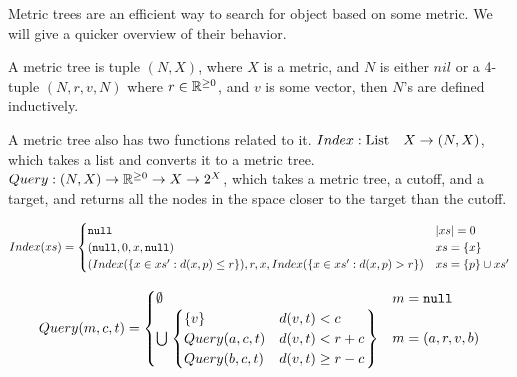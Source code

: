 Metric trees are an efficient way to search for object based on some metric.
We will give a quicker overview of their behavior.

\begin{definition}
A metric tree is tuple $(N, X)$, where $X$ is a metric,
and $N$ is either $nil$ or a 4-tuple $(N, r, v, N)$
where $r \in \mathbb{R}^{\ge 0}$, and $v$ is some vector,
then $N$'s are defined inductively.
\end{definition}

A metric tree also has two functions related to it.
$Index : \text{List}\quad X \to (N, X)$, which takes a list and converts it to a metric tree. 
$Query : (N, X) \to \mathbb{R}^{\ge 0} \to X \to 2^X$, which takes a metric tree, a cutoff, and a target,
and returns all the nodes in the space closer to the target than the cutoff.

$$Index(xs) = \begin{cases}
    \texttt{null} & |xs| = 0 \\
    (\texttt{null}, 0, x, \texttt{null}) & xs = \{x\} \\
    (Index(\{x \in xs' : d(x, p) \le r\}), r, x, Index(\{x \in xs' : d(x, p) > r\}) 
    & xs = \{p\}\cup{xs'}
\end{cases}$$

$$Query(m, c, t) = \begin{cases}
    \emptyset & m = \texttt{null} \\
    \bigcup \left. \begin{cases}
        \{v\} & d(v, t) < c \\ 
        Query(a, c, t) & d(v, t) < r + c \\ 
        Query(b, c, t) & d(v, t) \ge r - c \\
    \end{cases} \right\}& m = (a, r, v, b) \\
\end{cases}$$